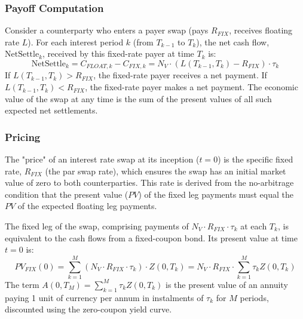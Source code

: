 \documentclass[11pt, a4paper, british]{article}
\begin{document}
\subsubsection{Payoff Computation}
Consider a counterparty who enters a payer swap (pays $R_{FIX}$, receives floating rate $L$). For each interest period $k$ (from $T_{k-1}$ to $T_k$), the net cash flow, $\text{NetSettle}_k$, received by this fixed-rate payer at time $T_k$ is:
\begin{equation}
 \text{NetSettle}_k = C_{FLOAT,k} - C_{FIX,k} = N_V \cdot (L(T_{k-1}, T_k) - R_{FIX}) \cdot \tau_k
 \label{eq:irs_net_settlement_rigorous_final}
\end{equation}
If $L(T_{k-1}, T_k) > R_{FIX}$, the fixed-rate payer receives a net payment. If $L(T_{k-1}, T_k) < R_{FIX}$, the fixed-rate payer makes a net payment. The economic value of the swap at any time is the sum of the present values of all such expected net settlements.

\subsubsection{Pricing}
The "price" of an interest rate swap at its inception ($t=0$) is the specific fixed rate, $R_{FIX}$ (the par swap rate), which ensures the swap has an initial market value of zero to both counterparties. This rate is derived from the no-arbitrage condition that the present value ($PV$) of the fixed leg payments must equal the $PV$ of the expected floating leg payments.

The fixed leg of the swap, comprising payments of $N_V \cdot R_{FIX} \cdot \tau_k$ at each $T_k$, is equivalent to the cash flows from a fixed-coupon bond. Its present value at time $t=0$ is:
\begin{equation}
 PV_{FIX}(0) = \sum_{k=1}^{M} (N_V \cdot R_{FIX} \cdot \tau_k) \cdot Z(0, T_k) = N_V \cdot R_{FIX} \cdot \sum_{k=1}^{M} \tau_k Z(0, T_k)
 \label{eq:pv_fixed_leg_final_v3}
\end{equation}
The term $A(0, T_M) = \sum_{k=1}^{M} \tau_k Z(0, T_k)$ is the present value of an annuity paying 1 unit of currency per annum in instalments of $\tau_k$ for $M$ periods, discounted using the zero-coupon yield curve.
\end{document}
